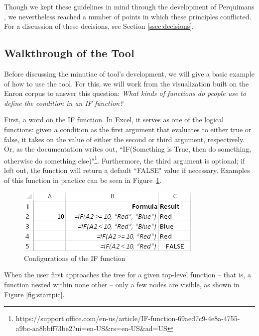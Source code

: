 \documentclass[conference]{IEEEtran}
\newcommand{\toolname}{Perquimans } \newcommand{\toolnameend}{Perquimans}
\begin{document}
	Though we kept these guidelines in mind through the development of \toolname,
	we nevertheless reached a number of points in which these principles
	conflicted. For a discussion of these decisions, see Section
	\ref{ssec:decisions}.
	
	\subsection{Walkthrough of the Tool} \label{sec:walkthrough}Before discussing
	the minutiae of tool's development, we will give a basic example of how to use
	the tool. For this, we will work from the visualization built on the Enron
	corpus to answer this question: \textit{ What kinds of functions do people use
		to define the condition in an IF function?} \par
	
	First, a word on the IF function. In Excel, it serves as one of the logical
	functions: given a condition as the first argument that evaluates to either
	true or false, it takes on the value of either the second or third argument,
	respectively. Or, as the documentation writes out, ``IF(Something is True, then
	do something, otherwise do something
	else)"\footnote{https://support.office.com/en-us/article/IF-function-69aed7c9-4e8a-4755-a9bc-aa8bbff73be2?ui=en-US\&rs=en-US\&ad=US}. Furthermore, the third argument is optional; if left out, the function will return a default ``FALSE" value if necessary. Examples of this function in practice can be seen in Figure~\ref{fig:ifexample}.
	
	\begin{figure}[h] \centering \includegraphics[scale=.9]{ifExample}
		\caption{Configurations of the IF function} \label{fig:ifexample} \end{figure}
	
	When the user first approaches the tree for a given top-level function -- that
	is, a function nested within none other -- only a few nodes are visible, as
	shown in Figure \ref{fig:startpic}. \par
	
\end{document}
